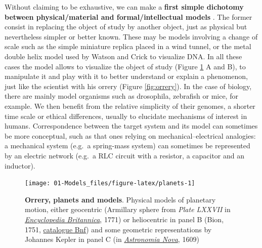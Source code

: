 \documentclass[a4paper,12pt,twoside,onecolumn,openright,final,oldfontcommands]{memoir}
\begin{document}
Without claiming to be exhaustive, we can make a \textbf{first simple
dichotomy between physical/material and formal/intellectual models}
\citep{rosenblueth1945role}. The former consist in replacing the object
of study by another object, just as physical but nevertheless simpler or
better known. These may be models involving a change of scale such as
the simple miniature replica placed in a wind tunnel, or the metal
double helix model used by Watson and Crick to visualize DNA. In all
these cases the model allows to visualize the object of study (Figure
\ref{fig:planets} A and B), to manipulate it and play with it to better
understand or explain a phenomenon, just like the scientist with his
orrery (Figure \ref{fig:orrery}). In the case of biology, there are
mainly model organisms such as drosophila, zebrafish or mice, for
example. We then benefit from the relative simplicity of their genomes,
a shorter time scale or ethical differences, usually to elucidate
mechanisms of interest in humans. Correspondence between the target
system and its model can sometimes be more conceptual, such as that ones
relying on mechanical--electrical analogies: a mechanical system (e.g.~a
spring-mass system) can sometimes be represented by an electric network
(e.g.~a RLC circuit with a resistor, a capacitor and an inductor).

\begin{figure}

{\centering \texttt{[image: 01-Models\_files/figure-latex/planets-1]} 

}

\caption[Orrery, planets and models]{\textbf{Orrery, planets and models}. Physical
models of planetary motion, either geocentric (Armillary sphere from
\emph{Plate LXXVII} in
\href{https://commons.wikimedia.org/wiki/File:EB1711_Armillary_Sphere.png}{\emph{Encyclopedia
Britannica}}, 1771) or heliocentric in panel B (Bion, 1751,
\href{https://gallica.bnf.fr/ark:/12148/btv1b2600252q/f8.item.r=Bion}{catalogue
Bnf}) and some geometric representations by Johannes Kepler in panel C
(in
\href{https://commons.wikimedia.org/wiki/File:Kepler_astronomia_nova.jpg}{\emph{Astronomia
Nova}}, 1609)}\label{fig:planets}
\end{figure}
\end{document}
